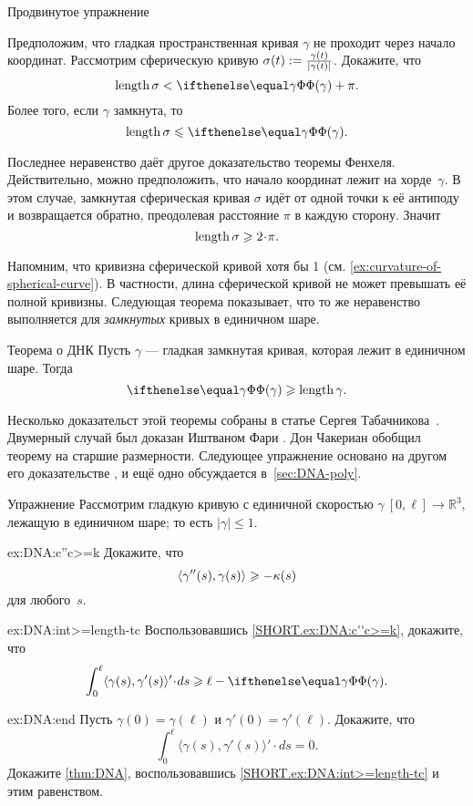\begin{thm}{Продвинутое упражнение}\label{ex:gamma/|gamma|}
{\sloppy
Предположим, что гладкая пространственная кривая $\gamma$ не проходит через начало координат.
Рассмотрим сферическую кривую $\sigma(t)\z\df\frac{\gamma(t)}{|\gamma(t)|}$.
Докажите, что
\[\length \sigma< \tc\gamma+\pi.\]
Более того, если $\gamma$ замкнута, то
\[\length \sigma\le \tc\gamma.\]

}
\end{thm}

Последнее неравенство даёт другое доказательство теоремы Фенхеля.
Действительно, можно предположить, что начало координат лежит на хорде~$\gamma$.
В этом случае, замкнутая сферическая кривая $\sigma$ идёт от одной точки к её антиподу и возвращается обратно,
преодолевая расстояние $\pi$ в каждую сторону.
Значит
\[\length\sigma\ge 2\cdot\pi.\]

Напомним, что кривизна сферической кривой хотя бы 1
(см. \ref{ex:curvature-of-spherical-curve}).
В частности, длина сферической кривой не может превышать её полной кривизны.
Следующая теорема показывает, что то же неравенство выполняется для \textit{замкнутых} кривых в единичном шаре.

\begin{thm}{Теорема о ДНК}\label{thm:DNA}
Пусть $\gamma$ --- гладкая замкнутая кривая, которая лежит в единичном шаре.
Тогда
\[\tc\gamma\ge \length\gamma.\]

\end{thm}

Несколько доказательст этой теоремы собраны в статье Сергея Табачникова~\cite{tabachnikov}.
Двумерный случай был доказан Иштваном Фари \cite{fary1950}.
Дон Чакериан \cite{chakerian1962} обобщил теорему на старшие размерности.
Следующее упражнение основано на другом его доказательстве \cite{chakerian1964},
и ещё одно обсуждается в~\ref{sec:DNA-poly}.

\begin{thm}{Упражнение}\label{ex:DNA}
Рассмотрим гладкую кривую с единичной скоростью $\gamma\:[0,\ell]\to\mathbb{R}^3$, лежащую в единичном шаре; то есть $|\gamma|\le 1$.

\begin{subthm}{ex:DNA:c''c>=k}
Докажите, что
\[\langle\gamma''(s),\gamma(s)\rangle\geqslant-\kappa(s)\]
для любого~$s$.
\end{subthm}

\begin{subthm}{ex:DNA:int>=length-tc}
Воспользовавшись \ref{SHORT.ex:DNA:c''c>=k}, докажите, что
\[\int_0^\ell\langle\gamma(s),\gamma'(s)\rangle'\cdot ds\ge
\ell-\tc\gamma.\]

\end{subthm}

\begin{subthm}{ex:DNA:end}
Пусть $\gamma(0)=\gamma(\ell)$ и $\gamma'(0)=\gamma'(\ell)$.
Докажите, что
\[\int_0^\ell\langle\gamma(s),\gamma'(s)\rangle'\cdot ds=0.\]
Докажите \ref{thm:DNA}, воспользовавшись \ref{SHORT.ex:DNA:int>=length-tc} и этим равенством.
\end{subthm}
\end{thm}


